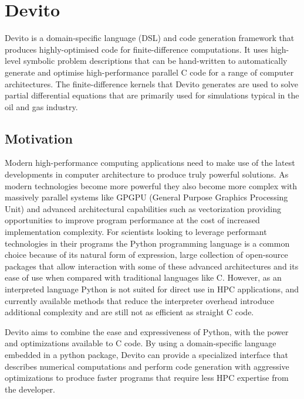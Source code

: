 \documentclass[a4paper,12pt,twoside]{report}
\begin{document}
\chapter{Devito}
Devito is a domain-specific language (DSL) and code generation framework that produces highly-optimised
code for finite-difference computations. It uses high-level symbolic problem descriptions that can be hand-written to automatically
generate and optimise high-performance parallel C code for a range of computer architectures. The finite-difference kernels that
Devito generates are used to solve partial differential equations that are primarily used for simulations typical in the oil and gas industry.

\section{Motivation}
Modern high-performance computing applications need to make use of the latest developments in computer architecture to produce truly
powerful solutions. As modern technologies become more powerful they also become more complex with massively parallel systems like
GPGPU (General Purpose Graphics Processing Unit) and advanced architectural capabilities such as vectorization providing opportunities
to improve program performance at the cost of increased implementation complexity. For scientists looking to leverage performant
technologies in their programs the Python programming language is a common choice because of its natural form of expression,
large collection of open-source packages that allow interaction with some of these advanced architectures and its ease of use when compared with traditional languages like C.
However, as an interpreted language Python is not suited for direct use in HPC applications, and currently available methods that reduce the interpreter overhead introduce
additional complexity and are still not as efficient as straight C code. 

Devito aims to combine the ease and expressiveness of Python, with the 
power and optimizations available to C code. By using a domain-specific language embedded in a python package, Devito can provide a specialized interface
that describes numerical computations and perform code generation with aggressive optimizations to produce faster programs that require less HPC expertise
from the developer.
\end{document}
